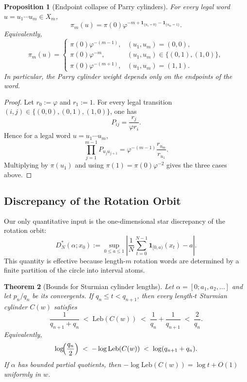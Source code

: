 \documentclass[11pt,letterpaper]{article}
\numberwithin{equation}{section}
\theoremstyle{plain}
\newtheorem{theorem}{Theorem}[section]
\newtheorem{proposition}[theorem]{Proposition}
\theoremstyle{definition}
\theoremstyle{remark}
\newcommand{\leb}{\mathrm{Leb}}
\begin{document}
\begin{proposition}[Endpoint collapse of Parry cylinders]\label{prop:parry-endpoint-collapse}
For every legal word \(u=u_1\cdots u_m\in X_m\),
\[
\pi_m(u)
=
\pi(0)\varphi^{-m+\mathbf{1}_{\{u_1=0\}}-\mathbf{1}_{\{u_m=1\}}}.
\]
Equivalently,
\[
\pi_m(u)=
\begin{cases}
\pi(0)\varphi^{-(m-1)}, & (u_1,u_m)=(0,0),\\
\pi(0)\varphi^{-m}, & (u_1,u_m)\in\{(0,1),(1,0)\},\\
\pi(0)\varphi^{-(m+1)}, & (u_1,u_m)=(1,1).
\end{cases}
\]
In particular, the Parry cylinder weight depends only on the endpoints of the
word.
\end{proposition}

\begin{proof}
Let \(r_0:=\varphi\) and \(r_1:=1\). For every legal transition
\((i,j)\in\{(0,0),(0,1),(1,0)\}\), one has
\[
P_{ij}=\frac{r_j}{\varphi r_i}.
\]
Hence for a legal word \(u=u_1\cdots u_m\),
\[
\prod_{j=1}^{m-1}P_{u_j u_{j+1}}
=
\varphi^{-(m-1)}\frac{r_{u_m}}{r_{u_1}}.
\]
Multiplying by \(\pi(u_1)\) and using \(\pi(1)=\pi(0)\varphi^{-2}\) gives the
three cases above.
\end{proof}

\subsection{Discrepancy of the Rotation Orbit}

Our only quantitative input is the one-dimensional star discrepancy of the
rotation orbit:
\[
D_N^*(\alpha;x_0)
:=
\sup_{0\le a\le 1}
\left|
\frac{1}{N}\sum_{t=0}^{N-1}\mathbf{1}_{[0,a)}(x_t)-a
\right|.
\]
This quantity is effective because length-$m$ rotation words are determined by a
finite partition of the circle into interval atoms.

\begin{theorem}[Bounds for Sturmian cylinder lengths]\label{thm:spg-sturmian-cylinder-measure-continued-fraction-sandwich}
Let $\alpha=[0;a_1,a_2,\dots]$ and let $p_n/q_n$ be its convergents.  If
$q_n\le t<q_{n+1}$, then every length-$t$ Sturmian cylinder $C(w)$ satisfies
\[
\frac{1}{q_{n+1}+q_n}
\;<\;
\leb(C(w))
\;<\;
\frac{1}{q_n}+\frac{1}{q_{n+1}}
\;<\;
\frac{2}{q_n}.
\]
Equivalently,
\[
\log\!\Bigl(\frac{q_n}{2}\Bigr)
\;<\;
-\log\leb(C(w))
\;<\;
\log(q_{n+1}+q_n).
\]
If $\alpha$ has bounded partial quotients, then
$-\log\leb(C(w))=\log t+O(1)$ uniformly in $w$.
\end{theorem}
\end{document}
